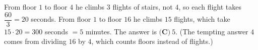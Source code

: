 From floor $1$ to floor $4$ he climbs $3$ flights of stairs, not $4$, so each flight takes $\dfrac{60}{3}=20$ seconds. From floor $1$ to floor $16$ he climbs $15$ flights, which take $15\cdot20=300$ seconds $=5$ minutes. The answer is $\boxed{\textbf{(C)}\ 5}$. (The tempting answer $4$ comes from dividing $16$ by $4$, which counts floors instead of flights.)
